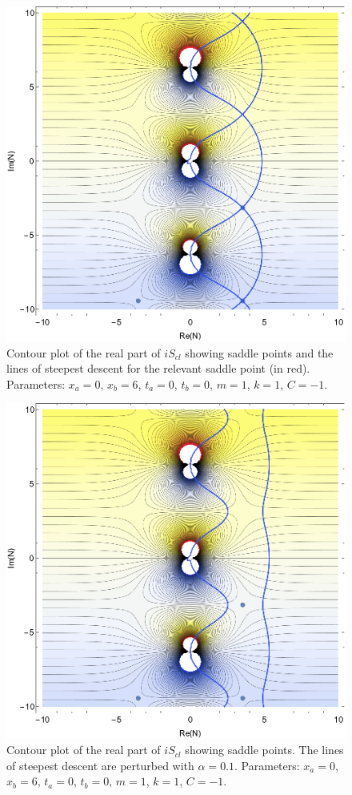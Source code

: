 \documentclass[12pt]{revtex4}
\begin{document}
\begin{figure}[h]
	\centering
	\includegraphics[width=0.7\linewidth]{lofda}
	\caption{Contour plot of the real part of $i S_{cl}$ showing saddle points and the lines of steepest descent for the relevant saddle point (in red). Parameters: $x_a=0$, $x_b=6$, $t_a=0$, $t_b=0$, $m=1$, $k=1$, $C=-1$.}
	\label{fig:lofda}
\end{figure}

\begin{figure}[h]
	\centering
	\includegraphics[width=0.7\linewidth]{nperturb}
	\caption{Contour plot of the real part of $i S_{cl}$ showing saddle points. The lines of steepest descent are perturbed with $\alpha = 0.1$. Parameters: $x_a=0$, $x_b=6$, $t_a=0$, $t_b=0$, $m=1$, $k=1$, $C=-1$.}
	\label{fig:nperturb}
\end{figure}
\end{document}
